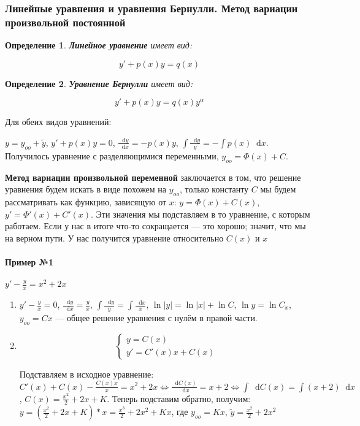 \documentclass{article}
\newcommand*\diff{\mathop{}\!\mathrm{d}}
\newtheorem{definition}{Определение}
\begin{document}
\subsubsection{Линейные уравнения и уравнения Бернулли. Метод вариации произвольной постоянной}

\begin{definition}{\textbf{Линейное уравнение}}
    имеет вид:

    $$y' + p(x)y = q(x)$$
\end{definition}

\begin{definition}{\textbf{Уравнение Бернулли}}
    имеет вид:

    $$y' + p(x)y = q(x) y^{\alpha}$$
\end{definition}

Для обеих видов уравнений:

$y = y_{oo} + \tilde{y}$, $y' + p(x) y = 0$, $\frac{\diff y}{\diff x} = -p(x) y$, $\int \frac{\diff y}{y} = - \int p(x) \diff x$. Получилось уравнение с разделяющимися переменными, $y_{oo} = \Phi(x) + C$.

\textbf{Метод вариации произвольной переменной} заключается в том, что решение уравнения будем искать в виде похожем на $y_{oo}$, только константу $C$ мы будем рассматривать как функцию, зависящую от $x$: $y = \Phi(x) + C(x)$, $y' = \Phi'(x) + C'(x)$. Эти значения мы подставляем в то уравнение, с которым работаем. Если у нас в итоге что-то сокращается — это хорошо; значит, что мы на верном пути. У нас получится уравнение относительно $C(x)$ и $x$

\paragraph{Пример №1}

$y' - \frac{y}{x} = x^2 + 2x$

\begin{enumerate}
    \item $y' - \frac{y}{x} = 0$, $\frac{\diff y}{\diff x} = \frac{y}{x}$, $\int \frac{\diff y}{y} = \int \frac{\diff x}{x}$, $\ln |y| = \ln |x| + \ln C$, $\ln y = \ln C_x$, $y_{oo} = Cx$ — общее решение уравнения с нулём в правой части.
    \item $$
    \begin{cases}
        y = C(x) \\
        y' = C'(x) x + C(x)
    \end{cases}$$

    Подставляем в исходное уравнение: $C'(x) + C(x) - \frac{C(x) x}{x} = x^2 + 2x \Longleftrightarrow \frac{\diff C(x)}{\diff x} = x + 2 \Longleftrightarrow \int \diff C(x) = \int (x + 2) \diff x$, $C(x) = \frac{x^2}{2} + 2x + K$. Теперь подставим обратно, получим: $y = (\frac{x^2}{2} + 2x + K) * x = \frac{x^3}{2} + 2x^2 + Kx$, где $y_{oo} = Kx$, $\tilde{y} = \frac{x^2}{2} + 2x^2$
\end{enumerate}
\end{document}
